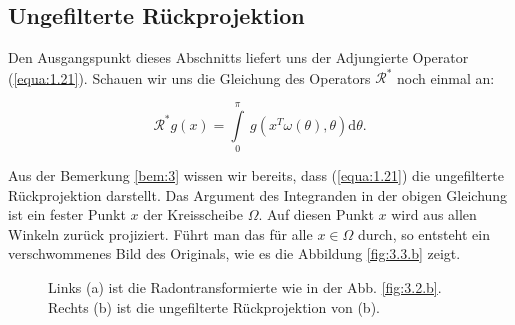 \subsection{Ungefilterte Rückprojektion}
\label{cha:3.1.1}

Den Ausgangspunkt dieses Abschnitts liefert uns der Adjungierte Operator (\ref{equa:1.21}). Schauen wir uns die Gleichung des Operators $\mathcal{R}^*$ noch einmal an: 

\[ \mathcal{R^*} g(x) = \int\limits_{0}^{\pi} \ g(x^{T}\omega(\theta),\theta) \mbox{d}\theta. \]  

Aus der Bemerkung \ref{bem:3} wissen wir bereits, dass (\ref{equa:1.21}) die ungefilterte Rückprojektion darstellt. Das Argument des Integranden in der obigen Gleichung ist ein fester Punkt $x$ der Kreisscheibe $\Omega$. Auf diesen Punkt $x$ wird aus allen Winkeln zurück projiziert. Führt man das für alle $x \in \Omega$ durch, so entsteht ein verschwommenes Bild des Originals, wie es die Abbildung \ref{fig:3.3.b} zeigt.
\begin{figure}[!h]
	\begin{center}
	\end{center}
	\caption{ Links (a) ist die Radontransformierte wie in der Abb. \ref{fig:3.2.b}. Rechts (b) ist die ungefilterte Rückprojektion von (b).}
	\label{fig:3.3}
\end{figure}

